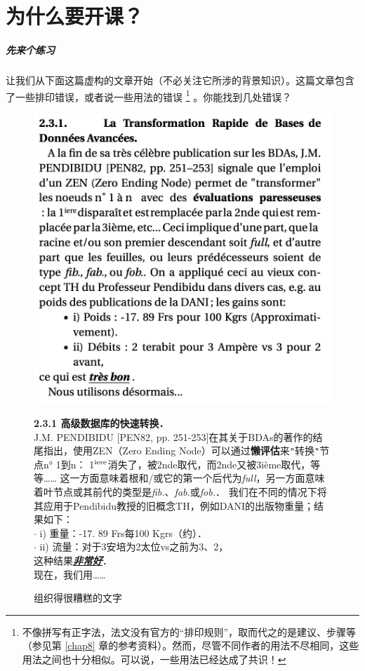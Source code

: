 \chapter{为什么要开课？}

\paragraph*{先来个练习}让我们从下面这篇虚构的文章开始（不必关注它所涉的背景知识）。这篇文章包含了一些排印错误，或者说一些用法的错误 
    \footnote{不像拼写有正字法，法文没有官方的“排印规则”，取而代之的是建议、步骤等（参见第 \ref{chap8} 章的参考资料）。然而，尽管不同作者的用法不尽相同，这些用法之间也十分相似。可以说，一些用法已经达成了共识！}
。你能找到几处错误？

\begin{figure}
    \centering
    \includegraphics[width = \linewidth]{img/1.png}

\begin{mdframed}
    \footnotesize
    \textbf{2.3.1 \quad 高级数据库的快速转换．}\\
    J.M. PENDIBIDU [PEN82, pp. 251-253]在其关于BDAs的著作的结尾指出，使用ZEN（Zero Ending Node）可以通过\textbf{懒评估}来\verb|"|转换\verb|"|节点n° 1到n：
    1$^{\rm iere}$消失了，被2nde取代，而2nde又被3ième取代，等等……
    这一方面意味着根和/或它的第一个后代为\emph{full}，另一方面意味着叶节点或其前代的类型是\emph{fib.}、\emph{fab.}或\emph{fob.}．
    我们在不同的情况下将其应用于Pendibidu教授的旧概念TH，例如DANI的出版物重量；结果如下：\\
    $\cdot$ i) 重量：-17. 89 Frs每100 Kgrs（约）．\\
    $\cdot$ ii) 流量：对于3安培为2太位vs之前为3、2，\\
    这种结果\textbf{\emph{\underline{非常好}}}．\\
    现在，我们用……
\end{mdframed}

    \caption{组织得很糟糕的文字}
    \label{fig1}
\end{figure}

